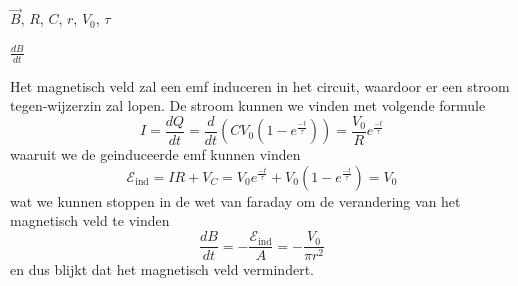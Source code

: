     \begin{description}[labelwidth=1.5cm, leftmargin=!]
        \item[Geg. :] $\vec{B}$, $R$, $C$, $r$, $V_0$, $\tau$
        \item[Gevr. :] $\frac{dB}{dt}$
        \item[Opl. :]
            Het magnetisch veld zal een emf induceren in het circuit, waardoor er een stroom tegen-wijzerzin zal lopen. De stroom kunnen we vinden met volgende formule 
            \begin{equation*}
                I = \frac{dQ}{dt} = \frac{d}{dt} \left(CV_0(1-e^{\frac{-t}{\tau}})\right) = \frac{V_0}{R}e^{\frac{-t}{\tau}}
            \end{equation*}
            waaruit we de geinduceerde emf kunnen vinden
            \begin{equation*}
                \mathcal{E}_{\text{ind}} = IR + V_C = V_0e^{\frac{-t}{\tau}} + V_0\left( 1 - e^{\frac{-t}{\tau}}\right) = V_0
            \end{equation*}
            wat we kunnen stoppen in de wet van faraday om de verandering van het magnetisch veld te vinden
            \begin{equation*}
                \frac{dB}{dt} = - \frac{\mathcal{E}_{\text{ind}}}{A} = - \frac{V_0}{\pi r^2}
            \end{equation*}
            en dus blijkt dat het magnetisch veld vermindert.

    \end{description}


\vspace{1cm}